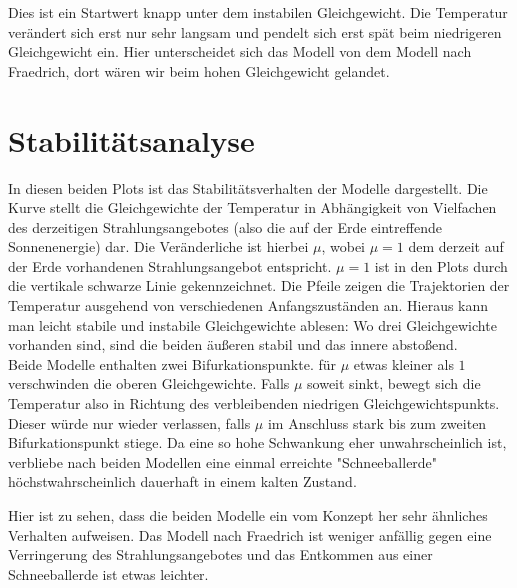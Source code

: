 \documentclass[]{report}
\begin{document}
Dies ist ein Startwert knapp unter dem instabilen Gleichgewicht. Die Temperatur verändert sich erst nur sehr langsam und pendelt sich erst spät beim niedrigeren Gleichgewicht ein. Hier unterscheidet sich das Modell von dem Modell nach Fraedrich, dort wären wir beim hohen Gleichgewicht gelandet.





\section{Stabilitätsanalyse}

\begin{figure} \centering \def\svgwidth{\columnwidth}  \end{figure}
\begin{figure} \centering \def\svgwidth{\columnwidth}  \end{figure}

In diesen beiden Plots ist das Stabilitätsverhalten der Modelle dargestellt. Die Kurve stellt die Gleichgewichte der Temperatur in Abhängigkeit von Vielfachen des derzeitigen Strahlungsangebotes (also die auf der Erde eintreffende Sonnenenergie) dar. Die Veränderliche ist hierbei $\mu$, wobei $\mu = 1$ dem derzeit auf der Erde vorhandenen Strahlungsangebot entspricht. $\mu = 1$ ist in den Plots durch die vertikale schwarze Linie gekennzeichnet. Die Pfeile zeigen die Trajektorien der Temperatur ausgehend von verschiedenen Anfangszuständen an. Hieraus kann man leicht stabile und instabile Gleichgewichte ablesen: Wo drei Gleichgewichte vorhanden sind, sind die beiden äußeren stabil und das innere abstoßend.\\
Beide Modelle enthalten zwei Bifurkationspunkte. für $\mu$ etwas kleiner als $1$ verschwinden die oberen Gleichgewichte. Falls $\mu$ soweit sinkt, bewegt sich die Temperatur also in Richtung des verbleibenden niedrigen Gleichgewichtspunkts. Dieser würde nur wieder verlassen, falls $\mu$ im Anschluss stark bis zum zweiten Bifurkationspunkt stiege. Da eine so hohe Schwankung eher unwahrscheinlich ist, verbliebe nach beiden Modellen eine einmal erreichte "Schneeballerde" höchstwahrscheinlich dauerhaft in einem kalten Zustand.

\begin{figure} \centering \def\svgwidth{\columnwidth}  \end{figure}

Hier ist zu sehen, dass die beiden Modelle ein vom Konzept her sehr ähnliches Verhalten aufweisen. Das Modell nach Fraedrich ist weniger anfällig gegen eine Verringerung des Strahlungsangebotes und das Entkommen aus einer Schneeballerde ist etwas leichter.
\end{document}
